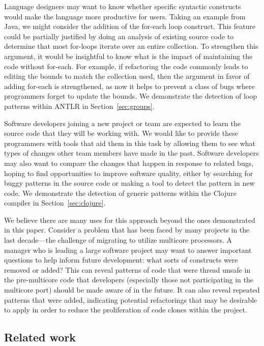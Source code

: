 Language designers may want to know whether specific syntactic constructs would
make the language more productive for users. Taking an example from Java, we
might consider the addition of the for-each loop construct. This feature could
be partially justified by doing an analysis of existing source code to
determine that most for-loops iterate over an entire collection. To strengthen
this argument, it would be insightful to know what is the impact of maintaining
the code without for-each. For example, if refactoring the code commonly leads
to editing the bounds to match the collection used, then the argument in favor
of adding for-each is strengthened, as now it helps to prevent a class of bugs
where programmers forget to update the bounds. We demonstrate the detection of
loop patterns within ANTLR in Section~\ref{sec:groups}.

Software developers joining a new project or team are expected to learn the
source code that they will be working with. We would like to provide these
programmers with tools that aid them in this task by allowing them to see what
types of changes other team members have made in the past. Software developers
may also want to compare the changes that happen in response to related bugs,
hoping to find opportunities to improve software quality, either by searching
for buggy patterns in the source code or making a tool to detect the pattern in
new code. We demonstrate the detection of generic patterns within the
Clojure compiler in Section~\ref{sec:clojure}.

We believe there are many uses for this approach beyond the ones demonstrated
in this paper. Consider a problem that has been faced by many projects in the
last decade---the challenge of migrating to utilize multicore processors.  A
manager who is leading a large software project may want to answer important
questions to help inform future development: what sorts of constructs were
removed or added?  This can reveal patterns of code that were thread unsafe in
the pre-multicore code that developers (especially those not participating in
the multicore port) should be made aware of in the future.  It can also reveal
repeated patterns that were added, indicating potential refactorings that may
be desirable to apply in order to reduce the proliferation of code clones
within the project.


\subsection{Related work}

